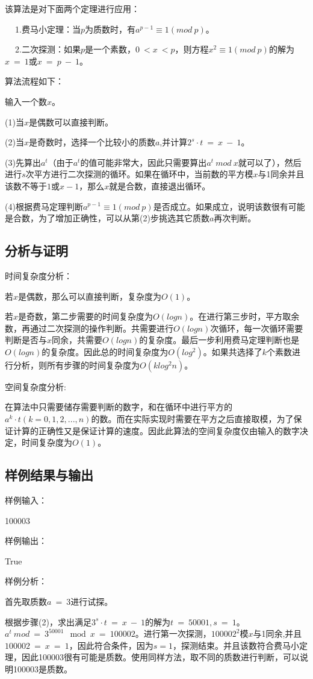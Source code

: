 \documentclass[UTF8,a4paperdui, %
]{ctexart}
\begin{document}
该算法是对下面两个定理进行应用：

$\ \ \ \ $	1.费马小定理：当$p$为质数时，有$a^{p-1}\equiv 1(mod\ p)$。

$\ \ \ \ $	2.二次探测：如果$p$是一个素数，$0\ < x\ < p$，则方程$x^2\equiv 1(mod\ p)$的解为$x\ =\ 1$或$x\ =\ p\ -\ 1$。

算法流程如下：

输入一个数$x$。

(1)当$x$是偶数可以直接判断。

(2)当$x$是奇数时，选择一个比较小的质数$a$,并计算$2^s\cdot t\ =\ x\ -\ 1$。

(3)先算出$a^t$（由于$a^t$的值可能非常大，因此只需要算出$a^t\ mod\ x$就可以了），然后进行$s$次平方进行二次探测的循环。如果在循环中，当前数的平方模$x$与1同余并且该数不等于$1$或$x-1$，那么$x$就是合数，直接退出循环。

(4)根据费马定理判断$a^{p-1}\equiv 1(mod\ p)$是否成立。如果成立，说明该数很有可能是合数，为了增加正确性，可以从第(2)步挑选其它质数$a$再次判断。
\subsection{分析与证明}
时间复杂度分析：

若$x$是偶数，那么可以直接判断，复杂度为$O(1)$。

若$x$是奇数，第二步需要的时间复杂度为$O(logn)$。在进行第三步时，平方取余数，再通过二次探测的操作判断。共需要进行$O(logn)$次循环，每一次循环需要判断是否与$x$同余，共需要$O(logn)$的复杂度。最后一步利用费马定理判断也是$O(logn)$的复杂度。因此总的时间复杂度为$O(log^2)$。如果共选择了$k$个素数进行分析，则所有步骤的时间复杂度为$O(klog^2n)$。

空间复杂度分析:

在算法中只需要储存需要判断的数字，和在循环中进行平方的$a^{k}\cdot t(k=0,1,2,...,n)$的数。而在实际实现时需要在平方之后直接取模，为了保证计算的正确性又是保证计算的速度。因此此算法的空间复杂度仅由输入的数字决定，时间复杂度为$O(1)$。




\subsection{样例结果与输出}

样例输入：

100003

样例输出：

True

样例分析：

首先取质数$a\ =\ 3$进行试探。

根据步骤(2)，求出满足$3^s\cdot t\ =\ x\ -\ 1$的解为$t\ =\ 50001, s\ =\ 1$。$a^t\ mod\ =\ 3^50001\mod x\ =\ 100002$。进行第一次探测，$100002^2$模$x$与1同余,并且$100002\ =\ x\ =\ 1$，因此符合条件，因为$s=1$，探测结束。并且该数符合费马小定理，因此100003很有可能是质数。使用同样方法，取不同的质数进行判断，可以说明100003是质数。
\end{document}

